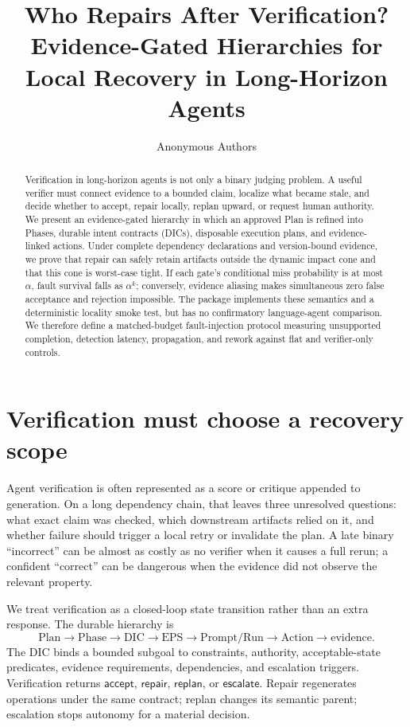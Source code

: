 \documentclass{article}
\title{Who Repairs After Verification? Evidence-Gated Hierarchies for Local Recovery in Long-Horizon Agents}
\author{Anonymous Authors}
\begin{document}
\maketitle
\begin{abstract}
Verification in long-horizon agents is not only a binary judging problem. A useful verifier must connect evidence to a bounded claim, localize what became stale, and decide whether to accept, repair locally, replan upward, or request human authority. We present an evidence-gated hierarchy in which an approved Plan is refined into Phases, durable intent contracts (DICs), disposable execution plans, and evidence-linked actions. Under complete dependency declarations and version-bound evidence, we prove that repair can safely retain artifacts outside the dynamic impact cone and that this cone is worst-case tight. If each gate's conditional miss probability is at most $\alpha$, fault survival falls as $\alpha^k$; conversely, evidence aliasing makes simultaneous zero false acceptance and rejection impossible. The package implements these semantics and a deterministic locality smoke test, but has no confirmatory language-agent comparison. We therefore define a matched-budget fault-injection protocol measuring unsupported completion, detection latency, propagation, and rework against flat and verifier-only controls.
\end{abstract}

\section{Verification must choose a recovery scope}
Agent verification is often represented as a score or critique appended to generation. On a long dependency chain, that leaves three unresolved questions: what exact claim was checked, which downstream artifacts relied on it, and whether failure should trigger a local retry or invalidate the plan. A late binary ``incorrect'' can be almost as costly as no verifier when it causes a full rerun; a confident ``correct'' can be dangerous when the evidence did not observe the relevant property.

We treat verification as a closed-loop state transition rather than an extra response. The durable hierarchy is
\[
\text{Plan}\to\text{Phase}\to\text{DIC}\to\text{EPS}\to\text{Prompt/Run}\to\text{Action}\to\text{evidence}.
\]
The DIC binds a bounded subgoal to constraints, authority, acceptable-state predicates, evidence requirements, dependencies, and escalation triggers. Verification returns $\mathsf{accept}$, $\mathsf{repair}$, $\mathsf{replan}$, or $\mathsf{escalate}$. Repair regenerates operations under the same contract; replan changes its semantic parent; escalation stops autonomy for a material decision.
\end{document}
